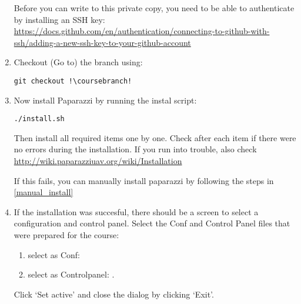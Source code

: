 \begin{enumerate}
	Before you can write to this private copy, you need to be able to authenticate by installing an SSH key: \href{https://docs.github.com/en/authentication/connecting-to-github-with-ssh/adding-a-new-ssh-key-to-your-github-account}{https://docs.github.com/en/authentication/connecting-to-github-with-ssh/adding-a-new-ssh-key-to-your-github-account}

	\item Checkout (Go to) the \coursebranch{} branch using:
	\begin{lstlisting}[style=Bash]
		git checkout !\coursebranch!
	\end{lstlisting}

	\item Now install Paparazzi by running the instal script:
	\begin{lstlisting}[style=Bash]
		./install.sh
	\end{lstlisting}

	Then install all required items one by one. Check after each item if there were no errors during the installation. If you run into trouble, also check \url{http://wiki.paparazziuav.org/wiki/Installation}

	If this fails, you can manually install paparazzi by following the steps in \autoref{manual_install}
	
	\item If the installation was succesful, there should be a screen to select a configuration and control panel. Select the Conf and Control Panel files that were prepared for the course:
	\begin{enumerate}
	\item select as Conf: \\
	\item select as Controlpanel: .\\
	\end{enumerate}
	Click `Set active' and close the dialog by clicking `Exit'.
	

	

\end{enumerate}
